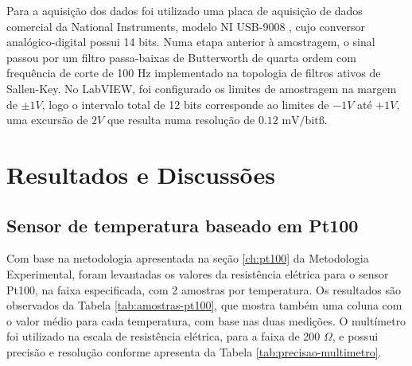 \documentclass[a4paper]{instrumentacao}
\begin{document}
Para a aquisição dos dados foi utilizado uma placa de aquisição de dados comercial da National Instruments, modelo NI USB-9008 , cujo conversor analógico-digital possui 14 bits. Numa etapa anterior à amostragem, o sinal passou por um filtro passa-baixas de Butterworth de quarta ordem com frequência de corte de 100 Hz implementado na topologia de filtros ativos de Sallen-Key. No LabVIEW, foi configurado os limites de amostragem na margem de $\pm 1V$, logo o intervalo total de 12 bits corresponde ao limites de $-1V$ até $+1V$, uma excursão de $2V$ que resulta numa resolução de $0.12\text{ mV/bit}ß$.



\chapter{Resultados e Discussões}
\section{Sensor de temperatura baseado em Pt100}
Com base na metodologia apresentada na seção \ref{ch:pt100} da Metodologia Experimental, foram levantadas os valores da resistência elétrica para o sensor Pt100, na faixa especificada, com 2 amostras por temperatura. Os resultados são observados da Tabela \ref{tab:amostras-pt100}, que mostra também uma coluna com o valor médio para cada temperatura, com base nas duas medições. O multímetro foi utilizado na escala de resistência elétrica, para a faixa de 200 $\Omega$, e possui precisão e resolução conforme apresenta da Tabela \ref{tab:precisao-multimetro}.
\end{document}
